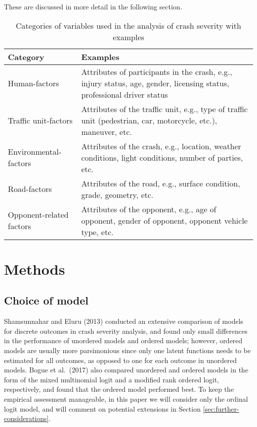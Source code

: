 \documentclass[]{elsarticle} %
\begin{document}
These are discussed in more detail in the following section.

\begin{table}

\caption{\label{tab:table-variable-categories}\label{tab:variable-categories}Categories of variables used in the analysis of crash severity with examples}
\centering
\fontsize{7}{9}\selectfont
\begin{tabular}[t]{l>{\raggedright\arraybackslash}p{22em}}
\toprule
Category & Examples\\
\midrule
Human-factors & Attributes of participants in the crash, e.g., injury status, age, gender, licensing status, professional driver status\\
Traffic unit-factors & Attributes of the traffic unit, e.g., type of traffic unit (pedestrian, car, motorcycle, etc.), maneuver, etc.\\
Environmental-factors & Attributes of the crash, e.g., location, weather conditions, light conditions, number of parties, etc.\\
Road-factors & Attributes of the road, e.g., surface condition, grade, geometry, etc.\\
Opponent-related factors & Attributes of the opponent, e.g., age of opponent, gender of opponent, opponent vehicle type, etc.\\
\bottomrule
\end{tabular}
\end{table}

\hypertarget{sec:methods}{%
\section{Methods}\label{sec:methods}}

\hypertarget{choice-of-model}{%
\subsection{Choice of model}\label{choice-of-model}}

Shamsunnahar and Eluru (2013) conducted an extensive comparison of
models for discrete outcomes in crash severity analysis, and found only
small differences in the performance of unordered models and ordered
models; however, ordered models are usually more parsimonious since only
one latent functions needs to be estimated for all outcomes, as opposed
to one for each outcome in unordered models. Bogue et al.~(2017) also
compared unordered and ordered models in the form of the mixed
multinomial logit and a modified rank ordered logit, respectively, and
found that the ordered model performed best. To keep the empirical
assessment manageable, in this paper we will consider only the ordinal
logit model, and will comment on potential extensions in Section
\ref{sec:further-considerations}.
\end{document}
